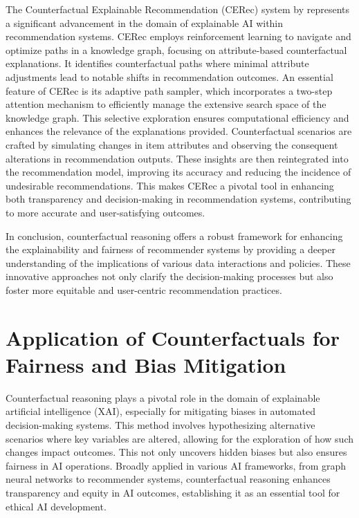 The Counterfactual Explainable Recommendation (CERec) system by \textcite{wang_reinforced_2024}
represents a significant advancement in the domain of explainable AI within recommendation
systems. CERec employs reinforcement learning to navigate and optimize paths in
a knowledge graph, focusing on attribute-based counterfactual explanations. It
identifies counterfactual paths where minimal attribute adjustments lead to
notable shifts in recommendation outcomes. An essential feature of CERec is its adaptive
path sampler, which incorporates a two-step attention mechanism to efficiently
manage the extensive search space of the knowledge graph. This selective exploration
ensures computational efficiency and enhances the relevance of the explanations provided.
Counterfactual scenarios are crafted by simulating changes in item attributes
and observing the consequent alterations in recommendation outputs. These insights
are then reintegrated into the recommendation model, improving its accuracy and
reducing the incidence of undesirable recommendations. This makes CERec a pivotal
tool in enhancing both transparency and decision-making in recommendation systems,
contributing to more accurate and user-satisfying outcomes.


In conclusion, counterfactual reasoning offers a robust framework for enhancing
the explainability and fairness of recommender systems by providing a deeper
understanding of the implications of various data interactions and policies. These
innovative approaches not only clarify the decision-making processes but also foster
more equitable and user-centric recommendation practices.

\section{Application of Counterfactuals for Fairness and Bias Mitigation}

Counterfactual reasoning plays a pivotal role in the domain of explainable
artificial intelligence (XAI), especially for mitigating biases in automated decision-making
systems. This method involves hypothesizing alternative scenarios where key
variables are altered, allowing for the exploration of how such changes impact outcomes.
This not only uncovers hidden biases but also ensures fairness in AI operations.
Broadly applied in various AI frameworks, from graph neural networks to
recommender systems, counterfactual reasoning enhances transparency and equity in
AI outcomes, establishing it as an essential tool for ethical AI development.

